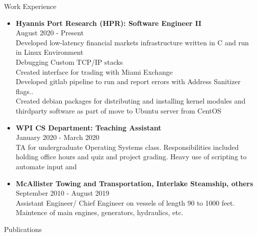 \documentclass[10pt,a4paper]{article}
\begin{document}
{\begin{tcolorbox}

  {\selectfont
    \begin{center}
      \LARGE{Work Experience}
    \end{center}
  }

  \tcblower

  \begin{itemize}
  \item
    {
      \large{\textbf{Hyannis Port Research (HPR): Software Engineer II}} \\
      August 2020 - Present \\
      Developed low-latency financial markets infrastructure written in C and run in Linux Environment \\
      Debugging Custom TCP/IP stacks \\
      Created interface for trading with Miami Exchange \\
      Developed gitlab pipeline to run and report errors with Address Sanitizer flags.. \\
      Created debian packages for distributing and installing kernel modules and thirdparty software as part of move to Ubuntu server from CentOS
    }

  \item
    {
      \large{\textbf{WPI CS Department: Teaching Assistant}} \\
      January 2020 - March 2020 \\
      TA for undergraduate Operating Systems class. Responsibilities included holding office hours and quiz and project grading. Heavy use of scripting to automate input and
    }

  \item
    {
      \large{\textbf{McAllister Towing and Transportation, Interlake Steamship, others}} \\
      September 2010 - August 2019 \\
      Assistant Engineer/ Chief Engineer on vessels of length 90 to 1000 feet. Maintence of main engines, generators, hydraulics, etc.
    }
  \end{itemize}

\end{tcolorbox}

\begin{tcolorbox}

  {\selectfont
    \begin{center}
      \LARGE{Publications}
    \end{center}
  }


\end{tcolorbox}}
\end{document}
